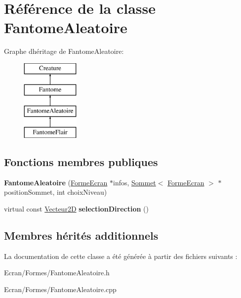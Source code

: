 \hypertarget{class_fantome_aleatoire}{}\section{Référence de la classe Fantome\+Aleatoire}
\label{class_fantome_aleatoire}
Graphe d\textquotesingle{}héritage de Fantome\+Aleatoire\+:\begin{figure}[H]
\begin{center}
\leavevmode
\includegraphics[height=4.000000cm]{class_fantome_aleatoire}
\end{center}
\end{figure}
\subsection*{Fonctions membres publiques}
\begin{DoxyCompactItemize}
\item 
\mbox{\label{class_fantome_aleatoire_ac96b995c1c1ce502d911cc7f2759916a}} 
{\bfseries Fantome\+Aleatoire} (\mbox{\hyperlink{class_forme_ecran}{Forme\+Ecran}} $\ast$infos, \mbox{\hyperlink{class_sommet}{Sommet}}$<$ \mbox{\hyperlink{class_forme_ecran}{Forme\+Ecran}} $>$ $\ast$position\+Sommet, int choix\+Niveau)
\item 
\mbox{\label{class_fantome_aleatoire_ae85bd45742864daf7ff41bd3737a772c}} 
virtual const \mbox{\hyperlink{class_vecteur2_d}{Vecteur2D}} {\bfseries selection\+Direction} ()
\end{DoxyCompactItemize}
\subsection*{Membres hérités additionnels}


La documentation de cette classe a été générée à partir des fichiers suivants \+:\begin{DoxyCompactItemize}
\item 
Ecran/\+Formes/Fantome\+Aleatoire.\+h\item 
Ecran/\+Formes/Fantome\+Aleatoire.\+cpp\end{DoxyCompactItemize}
